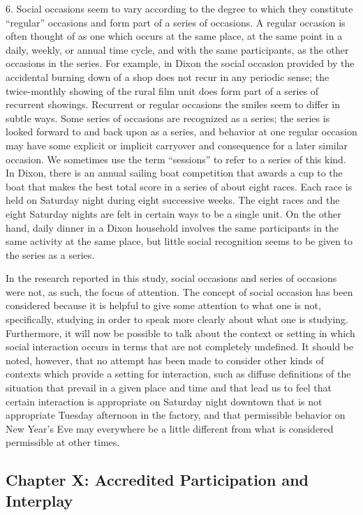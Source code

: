 \documentclass[twoside,symmetric,nobib,justified]{tufte-book}
\let\oldchapter\chapter
\def\chapter{%
  \setcounter{footnote}{0}%
  \oldchapter
}
\begin{document}
6. Social occasions seem to vary according to the degree to which they
constitute ``regular'' occasions and form part of a series of occasions.
A regular occasion is often thought of as one which occurs at the same
place, at the same point in a daily, weekly, or annual time cycle, and
with the same participants, as the other occasions in the series. For
example, in Dixon the social occasion provided by the accidental burning
down of a shop does not recur in any periodic sense; the twice-monthly
showing of the rural film unit does form part of a series of recurrent
showings. Recurrent or regular occasions the smiles seem to differ in
subtle ways. Some series of occasions are recognized as a series; the
series is looked forward to and back upon as a series, and behavior at
one regular occasion may have some explicit or implicit carryover and
consequence for a later similar occasion. We sometimes use the term
``sessions'' to refer to a series of this kind. In Dixon, there is an
annual sailing boat competition that awards a cup to the boat that makes
the best total score in a series of about eight races. Each race is held
on Saturday night during eight successive weeks. The eight races and the
eight Saturday nights are felt in certain ways to be a single unit. On
the other hand, daily dinner in a Dixon household involves the same
participants in the same activity at the same place, but little social
recognition seems to be given to the series as a series.

In the research reported in this study, social occasions and series of
occasions were not, as such, the focus of attention. The concept of
social occasion has been considered because it is helpful to give some
attention to what one is not, specifically, studying in order to speak
more clearly about what one is studying. Furthermore, it will now be
possible to talk about the context or setting in which social
interaction occurs in terms that are not completely undefined. It should
be noted, however, that no attempt has been made to consider other kinds
of contexts which provide a setting for interaction, such as diffuse
definitions of the situation that prevail in a given place and time and
that lead us to feel that certain interaction is appropriate on Saturday
night downtown that is not appropriate Tuesday afternoon in the factory,
and that permissible behavior on New Year's Eve may everywhere be a
little different from what is considered permissible at other times.

\begin{fullwidth}
    

\chapter[CHAPTER X: ACCREDITED PARTICIPATION AND INTERPLAY]{Chapter X: Accredited Participation and Interplay}
\label{ch:Chapter X: Accredited Participation and Interplay}
\end{fullwidth}
\end{document}
